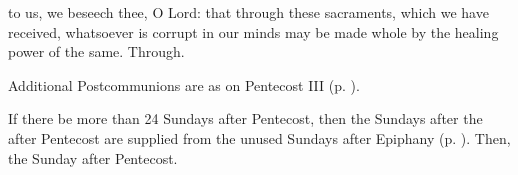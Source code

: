 \postcommunion
{} to us, we beseech thee, O Lord: that through these sacraments, which we have received, whatsoever is corrupt in our minds may be made whole by the healing power of the same. Through.
\begin{rubric}
    Additional Postcommunions are as on Pentecost III (p. \pageref{PentecostIII}).
\end{rubric}

\begin{rubric}
    If there be more than 24 Sundays after Pentecost, then the Sundays after the  after Pentecost are supplied from the unused Sundays after Epiphany (p. \pageref{epiphany}). Then, the  Sunday after Pentecost.
\end{rubric}
